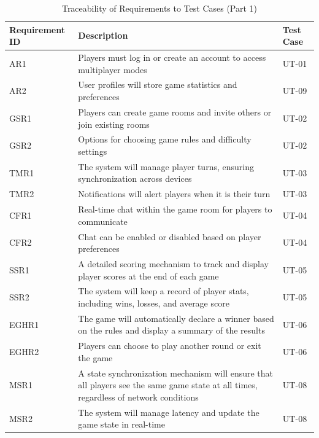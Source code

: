 \documentclass[12pt, titlepage]{article}
\begin{document}
\begin{table}[H]
    \centering
    \begin{tabularx}{\textwidth}{|l|X|l|}
        \hline
        \textbf{Requirement ID} & \textbf{Description} & \textbf{Test Case} \\
        \hline
        AR1 & Players must log in or create an account to access multiplayer modes & UT-01 \\
        AR2 & User profiles will store game statistics and preferences & UT-09 \\
        GSR1 & Players can create game rooms and invite others or join existing rooms & UT-02 \\
        GSR2 & Options for choosing game rules and difficulty settings & UT-02 \\
        TMR1 & The system will manage player turns, ensuring synchronization across devices & UT-03 \\
        TMR2 & Notifications will alert players when it is their turn & UT-03 \\
        CFR1 & Real-time chat within the game room for players to communicate & UT-04 \\
        CFR2 & Chat can be enabled or disabled based on player preferences & UT-04 \\
        SSR1 & A detailed scoring mechanism to track and display player scores at the end of each game & UT-05 \\
        SSR2 & The system will keep a record of player stats, including wins, losses, and average score & UT-05 \\
        EGHR1 & The game will automatically declare a winner based on the rules and display a summary of the results & UT-06 \\
        EGHR2 & Players can choose to play another round or exit the game & UT-06 \\
        MSR1 & A state synchronization mechanism will ensure that all players see the same game state at all times, regardless of network conditions & UT-08 \\
        MSR2 & The system will manage latency and update the game state in real-time & UT-08 \\
        \hline
    \end{tabularx}
    \caption{Traceability of Requirements to Test Cases (Part 1)}
    \label{tab:trace_requirements_1}
\end{table}
\end{document}
